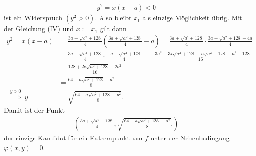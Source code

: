 \begin{align*}
y^2 = x (x - a) < 0 
\end{align*}
ist ein Widerspruch $ (y^2 > 0) $.
Also bleibt $ x_1  $ als einzige Möglichkeit übrig.
Mit der Gleichung (IV) und $ x := x_1 $ gilt dann
\begin{align*}
y^2 = x (x-a)
&= 
\frac{3a + \sqrt{a^2 + 128}}{4}
 \left(\frac{3a + \sqrt{a^2 + 128}}{4} - a \right)
=
\frac{3a + \sqrt{a^2 + 128}}{4}
 \cdot \frac{3a + \sqrt{a^2 + 128}  -4a}{4}\\
&=
\frac{3a + \sqrt{a^2 + 128}}{4}
\cdot \frac{-a + \sqrt{a^2 + 128} }{4}  
=
\frac{-3a^2 + 3a \sqrt{a^2 + 128} - a \sqrt{a^2 + 128} + a^2 +128  }{16}\\
&=
\frac{128  + 2a \sqrt{a^2 + 128} -2 a^2  }{16}\\
&=
\frac{64  + a \sqrt{a^2 + 128} - a^2  }{8}\\
\ \overset{y > 0}{\Rightarrow} \ 
y &= \sqrt{\frac{64  + a \sqrt{a^2 + 128} - a^2  }{8}}.
\end{align*}
Damit ist der Punkt
\begin{align*}
\left(\frac{3a + \sqrt{a^2 + 128}}{4}, \sqrt{\frac{64  + a \sqrt{a^2 + 128} - a^2  }{8}}. \right)
\end{align*}
der einzige Kandidat für ein Extrempunkt von $ f $ unter der Nebenbedingung $ \varphi(x,y) = 0 $.

\newpage